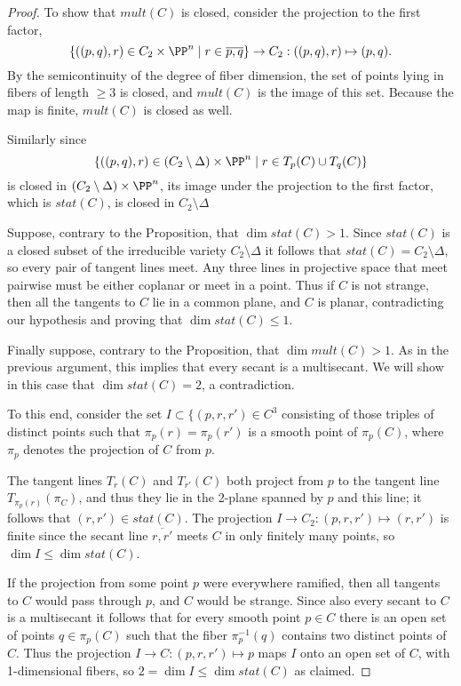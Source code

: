 \begin{proof}
To show that $mult(C)$ is closed, consider the projection to the first factor, 
$$
\{((p,q), r) \in C_2\times \PP^n \mid r \in \overline{p,q}\} \to C_2 : ((p,q),r)\mapsto (p,q).
$$
By the semicontinuity of the degree of fiber dimension, the set of points lying in fibers
of length $\geq 3$ is closed, and $mult(C)$ is the image of this set. Because the map is finite, 
$mult(C)$  is closed as well.

Similarly since 
$$
\{((p,q), r) \in (C_2\setminus \Delta)\times \PP^n \mid r \in T_p(C)\cup T_q(C) \}
$$
is closed in $(C_2\setminus \Delta)\times \PP^n$, its image under the projection to the first factor,
which is $stat(C)$, is closed in $C_2\setminus \Delta$

Suppose, contrary to the Proposition, that $\dim stat(C) >1$. Since $stat(C)$ is a closed subset of the irreducible variety $C_2\setminus \Delta$ it
follows that $stat(C) = C_2\setminus \Delta$, so every pair of tangent lines meet. Any three
lines in projective space that meet pairwise must be either coplanar or meet in a point. Thus if $C$ is not strange,
then all the tangents to $C$ lie in a common plane, and $C$ is planar, contradicting our hypothesis
and proving that $\dim stat(C)\leq 1$.

Finally suppose, contrary to the Proposition,  that $\dim mult(C)>1$. As in the previous argument, this
implies that every secant is a multisecant.  We will show in this case that $\dim stat(C) =2$, a contradiction. 

To this end, consider the set  $I \subset  \{(p,r,r')\in C^3$ consisting of those triples of distinct points 
such that $\pi_p(r) = \pi_p(r')$ is a smooth point of $\pi_p(C)$,
where $\pi_p$ denotes the projection of $C$ from $p$.

The tangent lines $T_r(C)$ and $T_{r'}(C)$ both project from $p$ to the tangent line $T_{\pi_p(r)}(\pi_C)$,
and thus they lie in the 2-plane spanned by $p$ and this line; it follows that $(r,r') \in stat(C)$.
The projection $I \to C_2: (p,r,r') \mapsto (r,r')$ is finite since the secant line $\overline{r,r'}$ meets $C$ in only finitely many points, 
so $\dim I \leq \dim stat(C)$.

 If the projection from some point $p$ were everywhere ramified,
then all tangents to $C$ would pass through $p$, and $C$ would be strange.
Since also every secant to $C$ is a multisecant it follows that  for every smooth point $p\in C$ there is an open set of points $q\in \pi_p(C)$ such that
the fiber $\pi_p^{-1}(q)$ contains two distinct points of $C$. Thus the projection $I \to C: (p,r,r') \mapsto p$ maps
$I$ onto an open set of $C$, with 1-dimensional fibers, so $2 = \dim I\leq \dim stat(C)$ as claimed. \end{proof}


